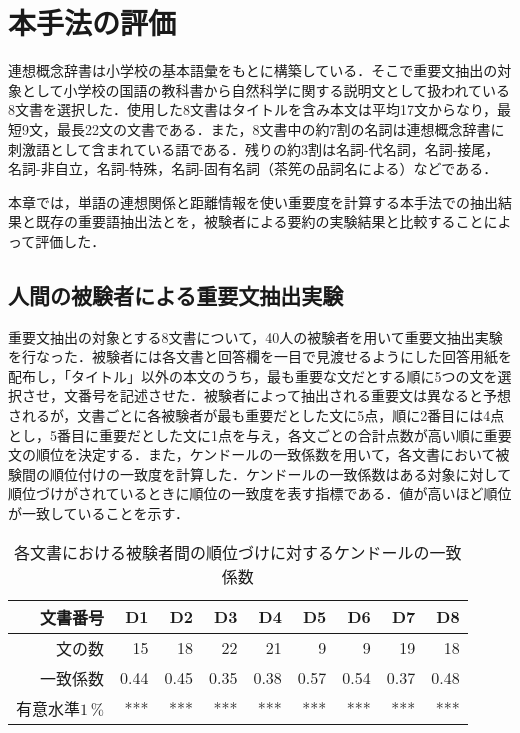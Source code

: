 \section{本手法の評価}


連想概念辞書は小学校の基本語彙をもとに構築している．そこで重要文抽出の対象として小学校の国語の教科書から自然科学に関する説明文として扱われている8文書を選択した．使用した8文書はタイトルを含み本文は平均17文からなり，最短9文，最長22文の文書である．また，8文書中の約7割の名詞は連想概念辞書に刺激語として含まれている語である．残りの約3割は名詞-代名詞，名詞-接尾，名詞-非自立，名詞-特殊，名詞-固有名詞（茶筅の品詞名による）などである．

本章では，単語の連想関係と距離情報を使い重要度を計算する本手法での抽出結果と既存の重要語抽出法とを，被験者による要約の実験結果と比較することによって評価した．

\subsection{人間の被験者による重要文抽出実験}\label{human_subject_extraction}


重要文抽出の対象とする8文書について，40人の被験者を用いて重要文抽出実験を行なった．被験者には各文書と回答欄を一目で見渡せるようにした回答用紙を配布し，「タイトル」以外の本文のうち，最も重要な文だとする順に5つの文を選択させ，文番号を記述させた．被験者によって抽出される重要文は異なると予想されるが，文書ごとに各被験者が最も重要だとした文に5点，順に2番目には4点とし，5番目に重要だとした文に1点を与え，各文ごとの合計点数が高い順に重要文の順位を決定する．また，ケンドールの一致係数を用いて，各文書において被験間の順位付けの一致度を計算した．ケンドールの一致係数はある対象に対して順位づけがされているときに順位の一致度を表す指標である．値が高いほど順位が一致していることを示す．

\begin{table}[htb]
\begin{center}
\caption{各文書における被験者間の順位づけに対するケンドールの一致係数}
\label{kendole}
\vspace*{1ex}

\begin{tabular}{|r||r|r|r|r|r|r|r|r|} \hline
文書番号&D1&D2&D3&D4&D5&D6&D7&D8\\ \hline 
文の数& 15&	18& 22& 21& 9& 9& 19& 18 \\ \hline
一致係数&0.44&0.45&0.35&0.38&0.57&0.54&0.37&0.48\\ \hline
有意水準$1$\,$\%$&***&***&***&***&***&***&***&***\\ \hline
\end{tabular}
\end{center}
\end{table}


